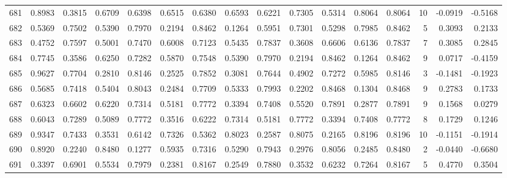 \begin{tabular}{lrrrrrrrrrrrrrrr}
681 &      0.8983 &  0.3815 &  0.6709 &  0.6398 &  0.6515 &  0.6380 &  0.6593 &  0.6221 &  0.7305 &  0.5314 &   0.8064 &     0.8064 &     10 &                   -0.0919 &                    -0.5168 \\
682 &      0.5369 &  0.7502 &  0.5390 &  0.7970 &  0.2194 &  0.8462 &  0.1264 &  0.5951 &  0.7301 &  0.5298 &   0.7985 &     0.8462 &      5 &                    0.3093 &                     0.2133 \\
683 &      0.4752 &  0.7597 &  0.5001 &  0.7470 &  0.6008 &  0.7123 &  0.5435 &  0.7837 &  0.3608 &  0.6606 &   0.6136 &     0.7837 &      7 &                    0.3085 &                     0.2845 \\
684 &      0.7745 &  0.3586 &  0.6250 &  0.7282 &  0.5870 &  0.7548 &  0.5390 &  0.7970 &  0.2194 &  0.8462 &   0.1264 &     0.8462 &      9 &                    0.0717 &                    -0.4159 \\
685 &      0.9627 &  0.7704 &  0.2810 &  0.8146 &  0.2525 &  0.7852 &  0.3081 &  0.7644 &  0.4902 &  0.7272 &   0.5985 &     0.8146 &      3 &                   -0.1481 &                    -0.1923 \\
686 &      0.5685 &  0.7418 &  0.5404 &  0.8043 &  0.2484 &  0.7709 &  0.5333 &  0.7993 &  0.2202 &  0.8468 &   0.1304 &     0.8468 &      9 &                    0.2783 &                     0.1733 \\
687 &      0.6323 &  0.6602 &  0.6220 &  0.7314 &  0.5181 &  0.7772 &  0.3394 &  0.7408 &  0.5520 &  0.7891 &   0.2877 &     0.7891 &      9 &                    0.1568 &                     0.0279 \\
688 &      0.6043 &  0.7289 &  0.5089 &  0.7772 &  0.3516 &  0.6222 &  0.7314 &  0.5181 &  0.7772 &  0.3394 &   0.7408 &     0.7772 &      8 &                    0.1729 &                     0.1246 \\
689 &      0.9347 &  0.7433 &  0.3531 &  0.6142 &  0.7326 &  0.5362 &  0.8023 &  0.2587 &  0.8075 &  0.2165 &   0.8196 &     0.8196 &     10 &                   -0.1151 &                    -0.1914 \\
690 &      0.8920 &  0.2240 &  0.8480 &  0.1277 &  0.5935 &  0.7316 &  0.5290 &  0.7943 &  0.2976 &  0.8056 &   0.2485 &     0.8480 &      2 &                   -0.0440 &                    -0.6680 \\
691 &      0.3397 &  0.6901 &  0.5534 &  0.7979 &  0.2381 &  0.8167 &  0.2549 &  0.7880 &  0.3532 &  0.6232 &   0.7264 &     0.8167 &      5 &                    0.4770 &                     0.3504 \\

\end{tabular}
